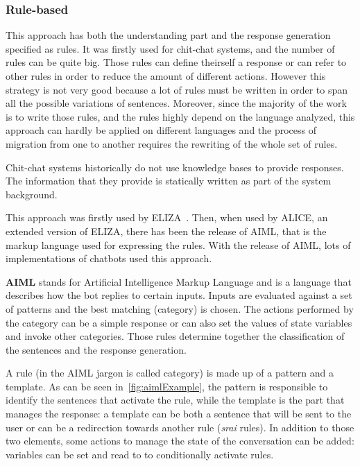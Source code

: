 \subsubsection{Rule-based}
\label{soaRuleApproach}

This approach has both the understanding part and the response generation specified as rules. It was firstly used for chit-chat systems, and the number of rules can be quite big. Those rules can define theirself a response or can refer to other rules in order to reduce the amount of different actions. However this strategy is not very good because a lot of rules must be written in order to span all the possible variations of sentences. Moreover, since the majority of the work is to write those rules, and the rules highly depend on the language analyzed, this approach can hardly be applied on different languages and the process of migration from one to another requires the rewriting of the whole set of rules.

Chit-chat systems historically do not use knowledge bases to provide responses. The information that they provide is statically written as part of the  system background.

This approach was firstly used by ELIZA~\cite{weizenbaum1966eliza}. Then, when used by ALICE, an extended version of ELIZA, there has been the release of AIML, that is the markup language used for expressing the rules. With the release of AIML, lots of implementations of chatbots used this approach.

\label{aiml}

\textbf{AIML} stands for Artificial Intelligence Markup Language and is a language that describes how the bot replies to certain inputs. Inputs are evaluated against a set of patterns and the best matching (category) is chosen. The actions performed by the category can be a simple response or can also set the values of state variables and invoke other categories. Those rules determine together the classification of the sentences and the response generation.

A rule (in the AIML jargon is called category) is made up of a pattern and a template. As can be seen in~\ref{fig:aimlExample}, the pattern is responsible to identify the sentences that activate the rule, while the template is the part that manages the response: a template can be both a sentence that will be sent to the user or can be a redirection towards another rule (\textit{srai} rules). In addition to those two elements, some actions to manage the state of the conversation can be added: variables can be set and read to to conditionally activate rules.

